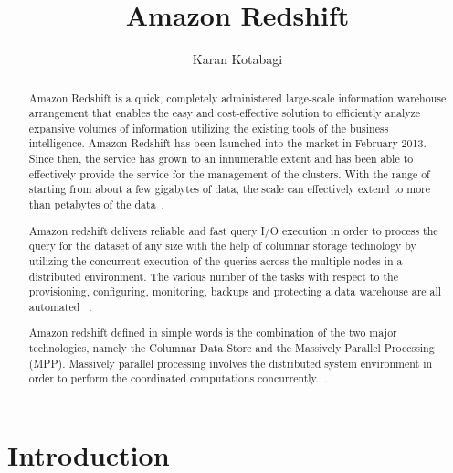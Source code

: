 \title{Amazon Redshift}

\author{Karan Kotabagi}

\begin{abstract}
	Amazon Redshift is a quick, completely administered large-scale 
	information warehouse arrangement that enables the easy and 
	cost-effective solution to efficiently analyze expansive volumes 
	of information utilizing the existing tools of the business 
	intelligence. Amazon Redshift has been launched into the market in 
	February 2013. Since then, the service has grown to an innumerable 
	extent and has been able to effectively provide the service for the 
	management of the clusters. With the range of starting from about a 
	few gigabytes of data, the scale can effectively extend to more 
	than petabytes of the 
	data~\cite{hid-sp18-412-hid-sp18-412_Gupta_2015_ARC}.
    
	Amazon redshift delivers reliable and fast query I/O execution in order 
	to process the query for the dataset of any size with the help of 
	columnar storage technology by utilizing the concurrent execution 
	of the queries across the multiple nodes in a distributed environment. 
	The various number of the tasks with respect to the provisioning, 
	configuring, monitoring, backups and protecting a 
	data warehouse are all automated ~\cite{hid-sp18-412-Aws_Tech_Target}. 
	
	Amazon redshift defined in simple words is the combination of the 
	two major technologies, namely the Columnar Data Store and the 
	Massively Parallel Processing (MPP). Massively parallel processing 
	involves the distributed system environment in order to perform the 
	coordinated computations 
	concurrently.~\cite{hid-sp18-412-what-is-amazon-redshift-aws}.

\end{abstract}


\maketitle

\section{Introduction}

